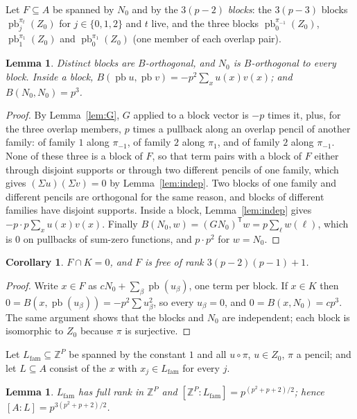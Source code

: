 \documentclass[11pt]{article}
\newtheorem{lemma}[theorem]{Lemma}
\newtheorem{corollary}[theorem]{Corollary}
\theoremstyle{definition}
\theoremstyle{remark}
\newcommand{\Z}{\mathbb{Z}}
\newcommand{\pb}{\operatorname{pb}}
\begin{document}
Let $F\subseteq A$ be spanned by $N_0$ and by the $3(p-2)$ \emph{blocks}: the $3(p-3)$ blocks $\pb_j^{\pi_t}(Z_0)$ for $j\in\{0,1,2\}$ and $t$ live, and the three blocks $\pb_0^{\pi_{-1}}(Z_0)$, $\pb_1^{\pi_1}(Z_0)$ and $\pb_0^{\pi_1}(Z_0)$ (one member of each overlap pair).

\begin{lemma}\label{lem:Fgram}
Distinct blocks are $B$-orthogonal, and $N_0$ is $B$-orthogonal to every block. Inside a block, $B(\pb u,\pb v)=-p^2\sum_xu(x)v(x)$; and $B(N_0,N_0)=p^3$.
\end{lemma}

\begin{proof}
By Lemma~\ref{lem:G}, $G$ applied to a block vector is $-p$ times it, plus, for the three overlap members, $p$ times a pullback along an overlap pencil of another family: of family $1$ along $\pi_{-1}$, of family $2$ along $\pi_1$, and of family $2$ along $\pi_{-1}$. None of these three is a block of $F$, so that term pairs with a block of $F$ either through disjoint supports or through two different pencils of one family, which gives $(\Sigma u)(\Sigma v)=0$ by Lemma~\ref{lem:indep}. Two blocks of one family and different pencils are orthogonal for the same reason, and blocks of different families have disjoint supports. Inside a block, Lemma~\ref{lem:indep} gives $-p\cdot p\sum_xu(x)v(x)$. Finally $B(N_0,w)=(GN_0)^{\mathsf T}w=p\sum_{\ell}w(\ell)$, which is $0$ on pullbacks of sum-zero functions, and $p\cdot p^2$ for $w=N_0$.
\end{proof}

\begin{corollary}\label{cor:FK}
$F\cap K=0$, and $F$ is free of rank $3(p-2)(p-1)+1$.
\end{corollary}

\begin{proof}
Write $x\in F$ as $cN_0+\sum_\beta\pb(u_\beta)$, one term per block. If $x\in K$ then $0=B(x,\pb(u_\beta))=-p^2\sum u_\beta^2$, so every $u_\beta=0$, and $0=B(x,N_0)=cp^3$. The same argument shows that the blocks and $N_0$ are independent; each block is isomorphic to $Z_0$ because $\pi$ is surjective.
\end{proof}

Let $L_{\mathrm{fam}}\subseteq\Z^P$ be spanned by the constant $1$ and all $u\circ\pi$, $u\in Z_0$, $\pi$ a pencil; and let $L\subseteq A$ consist of the $x$ with $x_j\in L_{\mathrm{fam}}$ for every $j$.

\begin{lemma}\label{lem:Lfam}
$L_{\mathrm{fam}}$ has full rank in $\Z^P$ and $[\Z^P:L_{\mathrm{fam}}]=p^{(p^2+p+2)/2}$; hence $[A:L]=p^{3(p^2+p+2)/2}$.
\end{lemma}
\end{document}
